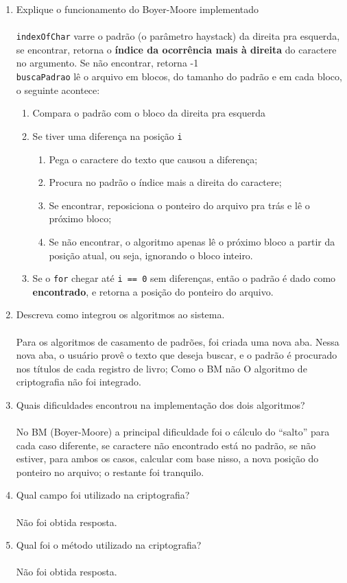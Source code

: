 \documentclass[12pt]{article}
\begin{document}
\begin{enumerate}
    \item Explique o funcionamento do Boyer-Moore implementado \\\\
    \texttt{indexOfChar} varre o padrão (o parâmetro haystack) da direita pra esquerda, se encontrar, retorna o \textbf{índice da ocorrência mais à direita} do caractere no argumento. Se não encontrar, retorna -1 \\
    \texttt{buscaPadrao} lê o arquivo em blocos, do tamanho do padrão e em cada bloco, o seguinte acontece: \\
    \begin{enumerate}
        \item Compara o padrão com o bloco da direita pra esquerda
        \item Se tiver uma diferença na posição \texttt{i} \\
        \begin{enumerate}
            \item Pega o caractere do texto que causou a diferença;
            \item Procura no padrão o índice mais a direita do caractere;
            \item Se encontrar, reposiciona o ponteiro do arquivo pra trás e lê o próximo bloco;
            \item Se não encontrar, o algoritmo apenas lê o próximo bloco a partir da posição atual, ou seja, ignorando o bloco inteiro.
        \end{enumerate}
        \item Se o \texttt{for} chegar até \texttt{i == 0} sem diferenças, então o padrão é dado como \textbf{encontrado}, e retorna a posição do ponteiro do arquivo.
    \end{enumerate}
    \newpage
    \item Descreva como integrou os algoritmos ao sistema. \\\\
    Para os algoritmos de casamento de padrões, foi criada uma nova aba. Nessa nova aba, o usuário provê o texto que deseja buscar, e o padrão é procurado nos títulos de cada registro de livro; Como o BM não  O algoritmo de criptografia não foi integrado.

    \item Quais dificuldades encontrou na implementação dos dois algoritmos? \\\\
    No BM (Boyer-Moore) a principal dificuldade foi o cálculo do ``salto'' para cada caso diferente, se caractere não encontrado está no padrão, se não estiver, para ambos os casos, calcular com base nisso, a nova posição do ponteiro no arquivo; o restante foi tranquilo.

    \item Qual campo foi utilizado na criptografia? \\\\
    Não foi obtida resposta.

    \item Qual foi o método utilizado na criptografia? \\\\
    Não foi obtida resposta.

\end{enumerate}
\end{document}
